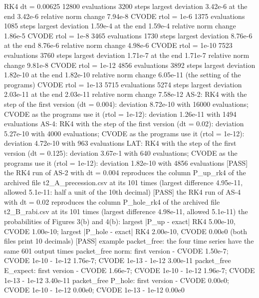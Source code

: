 \documentclass[
  10pt,
]{article}
\newenvironment{Shaded}{}{}
\newcommand{\NormalTok}[1]{#1}
\begin{document}
\begin{Shaded}
\begin{Highlighting}[]
\NormalTok{  RK4   dt = 0.00625     12800 evaluations    3200 steps  largest deviation 3.42e{-}6  at the end 3.42e{-}6  relative norm change 7.94e{-}8}
\NormalTok{  CVODE rtol = 1e{-}6       1375 evaluations    1085 steps  largest deviation 1.59e{-}4  at the end 1.59e{-}4  relative norm change 1.86e{-}5}
\NormalTok{  CVODE rtol = 1e{-}8       3465 evaluations    1730 steps  largest deviation 8.76e{-}6  at the end 8.76e{-}6  relative norm change 4.98e{-}6}
\NormalTok{  CVODE rtol = 1e{-}10      7523 evaluations    3760 steps  largest deviation 1.71e{-}7  at the end 1.71e{-}7  relative norm change 9.81e{-}8}
\NormalTok{  CVODE rtol = 1e{-}12      4856 evaluations    3892 steps  largest deviation 1.82e{-}10  at the end 1.82e{-}10  relative norm change 6.05e{-}11  (the setting of the programs)}
\NormalTok{  CVODE rtol = 1e{-}13      5715 evaluations    5274 steps  largest deviation 2.03e{-}11  at the end 2.03e{-}11  relative norm change 7.58e{-}12}
\NormalTok{AS{-}2: RK4 with the step of the first version (dt = 0.004): deviation 8.72e{-}10 with 16000 evaluations; CVODE as the programs use it (rtol = 1e{-}12): deviation 1.26e{-}11 with 1494 evaluations}
\NormalTok{AS{-}4: RK4 with the step of the first version (dt = 0.02): deviation 5.27e{-}10 with 4000 evaluations; CVODE as the programs use it (rtol = 1e{-}12): deviation 4.72e{-}10 with 963 evaluations}
\NormalTok{LAT: RK4 with the step of the first version (dt = 0.125): deviation 3.67e{-}1 with 640 evaluations; CVODE as the programs use it (rtol = 1e{-}12): deviation 1.82e{-}10 with 4856 evaluations}
\NormalTok{[PASS] the RK4 run of AS{-}2 with dt = 0.004 reproduces the column P\_up\_rk4 of the archived file t2\_A\_precession.csv at its 101 times (largest difference 4.95e{-}11, allowed 5.1e{-}11: half a unit of the 10th decimal)}
\NormalTok{[PASS] the RK4 run of AS{-}4 with dt = 0.02 reproduces the column P\_hole\_rk4 of the archived file t2\_B\_rabi.csv at its 101 times (largest difference 4.98e{-}11, allowed 5.1e{-}11)}
\NormalTok{the probabilities of Figures 3(b) and 4(b): largest |P\_up {-} exact| RK4 5.00e{-}10, CVODE 1.00e{-}10; largest |P\_hole {-} exact| RK4 2.00e{-}10, CVODE 0.00e0 (both files print 10 decimals)}
\NormalTok{[PASS] example packet\_free: the four time series have the same 601 output times}
\NormalTok{  packet\_free norm: first version {-} CVODE 1.50e{-}7; CVODE 1e{-}10 {-} 1e{-}12 1.76e{-}7; CVODE 1e{-}13 {-} 1e{-}12 3.00e{-}11}
\NormalTok{  packet\_free E\_expect: first version {-} CVODE 1.66e{-}7; CVODE 1e{-}10 {-} 1e{-}12 1.96e{-}7; CVODE 1e{-}13 {-} 1e{-}12 3.40e{-}11}
\NormalTok{  packet\_free P\_hole: first version {-} CVODE 0.00e0; CVODE 1e{-}10 {-} 1e{-}12 0.00e0; CVODE 1e{-}13 {-} 1e{-}12 0.00e0}

\end{Highlighting}
\end{Shaded}
\end{document}
